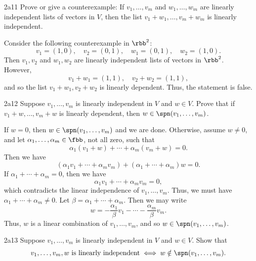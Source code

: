 \begin{exercise}{2a11}
    Prove or give a counterexample: If $v_1, \ldots, v_m$ and $w_1, \ldots, w_m$ are linearly independent lists of vectors in $V$, then the list $v_1 + w_1, \ldots, v_m + w_m$ is linearly independent.
\end{exercise}

\begin{sol}
    Consider the following counterexample in $\rbb^2$:
    \[
    	v_1 = (1, 0), \quad v_2 = (0, 1), \quad w_1 = (0, 1), \quad w_2 = (1, 0).
    \]
    Then $v_1, v_2$ and $w_1, w_2$ are linearly independent lists of vectors in $\rbb^2$.
	However,
    \[
    	v_1 + w_1 = (1, 1), \quad v_2 + w_2 = (1, 1),
    \]
    and so the list $v_1 + w_1, v_2 + w_2$ is linearly dependent.
	Thus, the statement is false.
\end{sol}
 
\begin{exercise}{2a12}
    Suppose $v_1, \ldots, v_m$ is linearly independent in $V$ and $w \in V$.
	Prove that if $v_1 + w, \ldots, v_m + w$ is linearly dependent, then $w \in \spn(v_1, \ldots, v_m)$.
\end{exercise}

\begin{sol}
    If $w = 0$, then $w \in \spn(v_1, \ldots, v_m)$ and we are done.
    Otherwise, assume $w \neq 0$, and let $\alpha_1, \ldots, \alpha_m \in \fbb$, not all zero, such that
    \[
    	\alpha_1(v_1 + w) + \cdots + \alpha_m(v_m + w) = 0.
    \]
    Then we have
    \[
    	(\alpha_1 v_1 + \cdots + \alpha_m v_m) + (\alpha_1 + \cdots + \alpha_m)w = 0.
    \]
    If $\alpha_1 + \cdots + \alpha_m = 0$, then we have
    \[
    	\alpha_1 v_1 + \cdots + \alpha_m v_m = 0,
    \]
    which contradicts the linear independence of $v_1, \ldots, v_m$.
	Thus, we must have $\alpha_1 + \cdots + \alpha_m \neq 0$.
	Let $\beta = \alpha_1 + \cdots + \alpha_m$.
	Then we may write
    \[
    	w = -\frac{\alpha_1}{\beta}v_1 - \cdots - \frac{\alpha_m}{\beta}v_m.
    \]
    Thus, $w$ is a linear combination of $v_1, \ldots, v_m$, and so $w \in \spn(v_1, \ldots, v_m)$.
\end{sol}
 
\begin{exercise}{2a13}
    Suppose $v_1, \ldots, v_m$ is linearly independent in $V$ and $w \in V$.
	Show that
    \[
    	v_1, \ldots, v_m, w \text{ is linearly independent} \iff w \notin \spn(v_1, \ldots, v_m).
    \]
\end{exercise}

